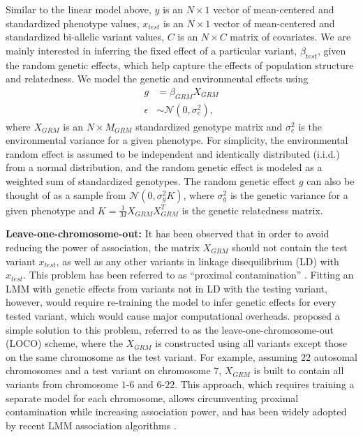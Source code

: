Similar to the linear model above, $y$ is an $N \times 1$ vector of mean-centered and standardized phenotype values, $x_{test}$ is an $N \times 1$ vector of mean-centered and standardized bi-allelic variant values, $C$ is an $N \times C$ matrix of covariates.
%
We are mainly interested in inferring the fixed effect of a particular variant, $\beta_{test}$, given the random genetic effects, which help capture the effects of population structure and relatedness.
%
We model the genetic and environmental effects using
\begin{align}
    g &= \beta_{GRM} X_{GRM} \nonumber \\
    \epsilon &\sim  \mathcal{N}(0, \sigma^2_e) \label{lmm-1},
\end{align}
where $X_{GRM}$ is an $N \times M_{GRM}$ standardized genotype matrix and $\sigma^2_e$ is the environmental variance for a given phenotype.
%
For simplicity, the environmental random effect is assumed to be independent and identically distributed (i.i.d.) from a normal distribution, and the random genetic effect is modeled as a weighted sum of standardized genotypes. The random genetic effect $g$ can also be thought of as a sample from $\mathcal{N}(0, \sigma^2_g K)$, where $\sigma^2_g$ is the genetic variance for a given phenotype and $K = \frac{1}{M}X_{GRM}X_{GRM}^T$ is the genetic relatedness matrix.




\textbf{Leave-one-chromosome-out: }
%
It has been observed that in order to avoid reducing the power of association, the matrix $X_{GRM}$ should not contain the test variant $x_{test}$, as well as any other variants in linkage disequilibrium (LD) with $x_{test}$.
%
This problem has been referred to as ``proximal contamination'' \cite{listgarten2012improved}.
%
Fitting an LMM with genetic effects from variants not in LD with the testing variant, however, would require re-training the model to infer genetic effects for every tested variant, which would cause major computational overheads.
%
\cite{yang2014advantages} proposed a simple solution to this problem, referred to as the leave-one-chromosome-out (LOCO) scheme, where the $X_{GRM}$ is constructed using all variants except those on the same chromosome as the test variant.
%
For example, assuming $22$ autosomal chromosomes and a test variant on chromosome $7$, $X_{GRM}$ is built to contain all variants from chromosome $1$-$6$ and $6$-$22$.
%
This approach, which requires training a separate model for each chromosome, allows circumventing proximal contamination while increasing association power, and has been widely adopted by recent LMM association algorithms \cite{loh2015efficient,loh2018mixed,jiang2019resource}.
%

